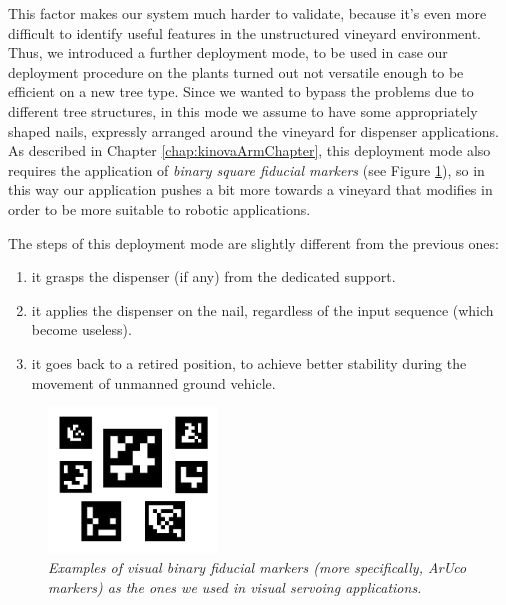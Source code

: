\begin{enumerate}
 	\par This factor makes our system much harder to validate, because it's even more difficult to identify useful features in the unstructured vineyard environment. Thus, we introduced a further deployment mode, to be used in case our deployment procedure on the plants turned out not versatile enough to be efficient on a new tree type. Since we wanted to bypass the problems due to different tree structures, in this mode we assume to have some appropriately shaped nails, expressly arranged around the vineyard for dispenser applications. As described in Chapter \ref{chap:kinovaArmChapter}, this deployment mode also requires the application of \textit{binary square fiducial markers} (see Figure \ref{fig:arucoMarkers}), so in this way our application pushes a bit more towards a vineyard that modifies in order to be more suitable to robotic applications.
 	\par The steps of this deployment mode are slightly different from the previous ones:
 	\begin{enumerate}
 		\item it grasps the dispenser (if any) from the dedicated support.
 		\item it applies the dispenser on the nail, regardless of the input sequence (which become useless).
 		\item it goes back to a retired position, to achieve better stability during the movement of unmanned ground vehicle.
 	\end{enumerate}
 \end{enumerate}

\begin{figure}
	\centering
	\includegraphics[width=0.4\textwidth]{Images/grape_sw_hw_architecture/arucoMarkers.png}
	\caption{\textit{Examples of visual binary fiducial markers (more specifically, ArUco markers) as the ones we used in visual servoing applications.}}
	\label{fig:arucoMarkers}
\end{figure}

